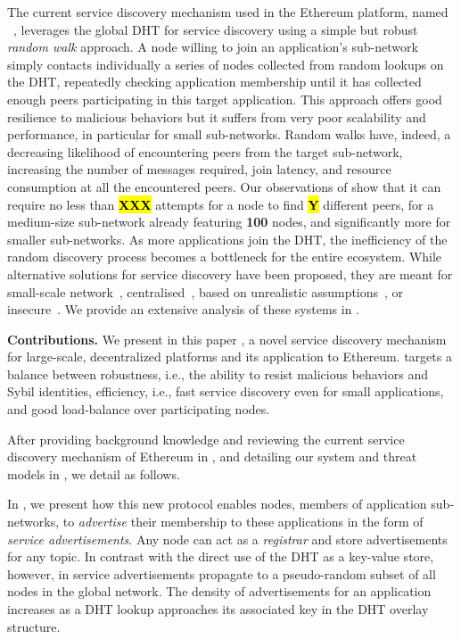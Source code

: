 The current service discovery mechanism used in the Ethereum platform, named \discv~\cite{discv4}, leverages the global DHT for service discovery using a simple but robust \emph{random walk} approach.
A node willing to join an application's sub-network simply contacts individually a series of nodes collected from random lookups on the DHT, repeatedly checking application membership until it has collected enough peers participating in this target application.
This approach offers good resilience to malicious behaviors but it suffers from very poor scalability and performance, in particular for small sub-networks.
Random walks have, indeed, a decreasing likelihood of encountering peers from the target sub-network, increasing the number of messages required, join latency, and resource consumption at all the encountered peers.
Our observations of \discv show that it can require no less than \hl{\textbf{XXX}}  attempts for a node to find \hl{\textbf{Y}}  different peers, for a medium-size sub-network already featuring \textbf{100} nodes, and significantly more for smaller sub-networks.
As more applications join the DHT, the inefficiency of the random discovery process becomes a bottleneck for the entire ecosystem.
While alternative solutions for service discovery have been proposed, they are meant for small-scale network~\cite{zhang2002aggregate, helal2002standards}, centralised~\cite{RFC6763}, based on unrealistic assumptions~\cite{danezis2005sybil, danezis2009sybilinfer}, or insecure~\cite{baldoni2007tera,scribe,poldercast,banno2015,scribe}.
We provide an extensive analysis of these systems in .

\smallskip
\noindent
\textbf{Contributions.}
%
We present in this paper \sysname, a novel service discovery mechanism for large-scale, decentralized platforms and its application to Ethereum.
\sysname targets a balance between robustness, i.e., the ability to resist malicious behaviors and Sybil identities, efficiency, i.e., fast service discovery even for small applications, and good load-balance over participating nodes.

After providing background knowledge and reviewing the current service discovery mechanism of Ethereum in , and detailing our system and threat models in , we detail \sysname as follows.

In , we present how this new protocol enables nodes, members of application sub-networks, to \emph{advertise} their membership to these applications in the form of \emph{service advertisements}.
Any node can act as a \emph{registrar} and store advertisements for any topic.
In contrast with the direct use of the DHT as a key-value store, however, in \sysname service advertisements propagate to a pseudo-random subset of all nodes in the global network.
The density of advertisements for an application increases as a DHT lookup approaches its associated key in the DHT overlay structure.


